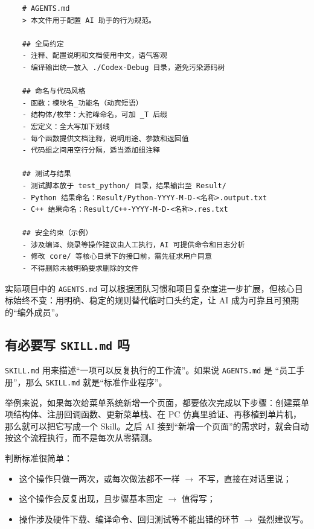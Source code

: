 \begin{lstlisting}
	# AGENTS.md
	> 本文件用于配置 AI 助手的行为规范。
	
	## 全局约定
	- 注释、配置说明和文档使用中文，语气客观
	- 编译输出统一放入 ./Codex-Debug 目录，避免污染源码树
	
	## 命名与代码风格
	- 函数：模块名_功能名（动宾短语）
	- 结构体/枚举：大驼峰命名，可加 _T 后缀
	- 宏定义：全大写加下划线
	- 每个函数提供文档注释，说明用途、参数和返回值
	- 代码组之间用空行分隔，适当添加组注释
	
	## 测试与结果
	- 测试脚本放于 test_python/ 目录，结果输出至 Result/
	- Python 结果命名：Result/Python-YYYY-M-D-<名称>.output.txt
	- C++ 结果命名：Result/C++-YYYY-M-D-<名称>.res.txt
	
	## 安全约束（示例）
	- 涉及编译、烧录等操作建议由人工执行，AI 可提供命令和日志分析
	- 修改 core/ 等核心目录下的接口前，需先征求用户同意
	- 不得删除未被明确要求删除的文件
\end{lstlisting}

实际项目中的 \texttt{AGENTS.md} 可以根据团队习惯和项目复杂度进一步扩展，但核心目标始终不变：用明确、稳定的规则替代临时口头约定，让 AI 成为可靠且可预期的“编外成员”。

\subsection{有必要写 \texttt{SKILL.md} 吗}

\texttt{SKILL.md} 用来描述“一项可以反复执行的工作流”。如果说 \texttt{AGENTS.md} 是 “员工手册”，那么 \texttt{SKILL.md} 就是“标准作业程序”。

举例来说，如果每次给菜单系统新增一个页面，都要依次完成以下步骤：创建菜单项结构体、注册回调函数、更新菜单栈、在 PC 仿真里验证、再移植到单片机，那么就可以把它写成一个 Skill。之后 AI 接到“新增一个页面”的需求时，就会自动按这个流程执行，而不是每次从零猜测。

判断标准很简单：

\begin{itemize}
\item 这个操作只做一两次，或每次做法都不一样 $\rightarrow$ 不写，直接在对话里说；
\item 这个操作会反复出现，且步骤基本固定 $\rightarrow$ 值得写；
\item 操作涉及硬件下载、编译命令、回归测试等不能出错的环节 $\rightarrow$ 强烈建议写。
\end{itemize}

